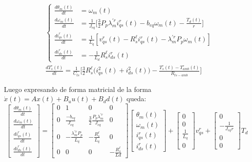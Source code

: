 \documentclass[blue,fullpaper]{ludusofficial}  %
\begin{document}
\begin{equation}
\begin{aligned}
& \left\{
    \begin{aligned}
        \frac{d\theta_m(t)}{dt} &= \omega_m(t) \\[1.5ex]
        \frac{d\omega_{m}(t)}{dt} &= \frac{1}{J_{eq}} \Bigg[ \frac{3}{2}P_{p} \lambda_{m}^{'r} i_{qs}^{r}(t) - b_{eq}  \omega_{m}(t) - \frac{T_d(t)}{r} \Bigg]  \\[1.5ex]
        \frac{di_{qs}^{r}(t)}{dt}  &= \frac{1}{L_{q} } \left[ v_{qs}^{r}(t) - R_{s}^{\ell} i_{qs}^{r}(t) - \lambda_{m}^{'r}P_{p} \omega_{m}(t) \right] \\[1.5ex]
        \frac{di_{ds}^{r}(t)}{dt} &= -\frac{1}{L_{d}} R_{s}^{\ell} i_{ds}^{r}(t)
    \end{aligned}
\right. \\[2ex]
& \frac{dT_{s}^{\circ}(t)}{dt} = \frac{1}{C_{ts}} \Bigg[ \frac{3}{2} R_{s}^{\ell}\Big(i_{qs}^{2}(t) +i_{ds}^{2}(t)\Big)  - \frac{T_{s}^{\circ}(t) - T_{amb}^{\circ}(t)}{R_{ts-amb}} \Bigg]
\end{aligned}
\end{equation}

Luego expresando de forma matricial de la forma $\dot{x}(t) = Ax(t) + B_u u(t) + B_d d(t)$ queda:
\begin{equation}
\begin{bmatrix}
\frac{d\theta_m(t)}{dt} \\
\frac{d\omega_m(t)}{dt}  \\
\frac{d i^r_{qs}(t)}{dt} \\
\frac{d i^r_{ds}(t)}{dt}
\end{bmatrix}
=\begin{bmatrix}
0 & 1 & 0 & 0 \\
0 & \frac{-b_{eq}}{J_{eq}} & \frac{3}{2}\frac{P_p\lambda_{m} ^{'r}}{J_{eq}} & 0 \\
0 & -\frac{\lambda^{'r}_{m}P_p}{L_q} & -\frac{R^\ell_s}{L_q} & 0 \\
0 & 0 & 0 & -\frac{R_s^\ell}{Ld}
\end{bmatrix}
\begin{bmatrix}
\theta_m(t) \\
\omega_m(t) \\
i_{qs}^r(t) \\
i_{ds}^r(t)
\end{bmatrix}+\begin{bmatrix}
0 \\
0\\
\frac{1}{L_q}\\
0
\end{bmatrix}
v^r_{qs}+\begin{bmatrix}
0 \\
-\frac{1}{J_{eq}r}\\
0 \\
0
\end{bmatrix} 
T_d
\end{equation}
\end{document}
